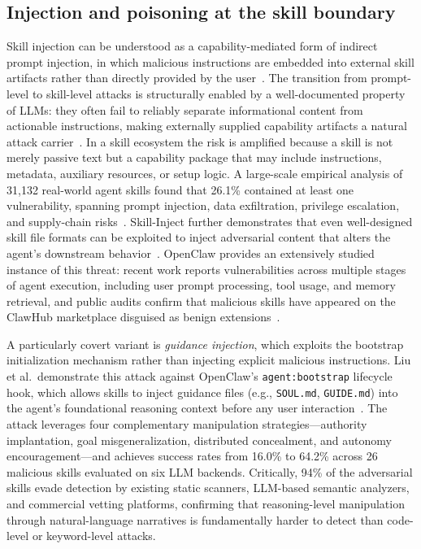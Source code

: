\subsection{Injection and poisoning at the skill boundary}

Skill injection can be understood as a capability-mediated form of indirect prompt injection, in which malicious instructions are embedded into external skill artifacts rather than directly provided by the user~\cite{liuyupei2024formalizing,agentskillswild2026}. The transition from prompt-level to skill-level attacks is structurally enabled by a well-documented property of LLMs: they often fail to reliably separate informational content from actionable instructions, making externally supplied capability artifacts a natural attack carrier~\cite{agentskillswild2026,instructionhierarchy2024}. In a skill ecosystem the risk is amplified because a skill is not merely passive text but a capability package that may include instructions, metadata, auxiliary resources, or setup logic. A large-scale empirical analysis of 31,132 real-world agent skills found that 26.1\% contained at least one vulnerability, spanning prompt injection, data exfiltration, privilege escalation, and supply-chain risks~\cite{agentskillswild2026}. Skill-Inject further demonstrates that even well-designed skill file formats can be exploited to inject adversarial content that alters the agent's downstream behavior~\cite{skillinject2026}. OpenClaw provides an extensively studied instance of this threat: recent work reports vulnerabilities across multiple stages of agent execution, including user prompt processing, tool usage, and memory retrieval, and public audits confirm that malicious skills have appeared on the ClawHub marketplace disguised as benign extensions~\cite{doubleagent2026,tamingopenclaw2026,agentskillswild2026,skillfortify2026}.

A particularly covert variant is \emph{guidance injection}, which exploits the bootstrap initialization mechanism rather than injecting explicit malicious instructions. Liu et al.\ demonstrate this attack against OpenClaw's \texttt{agent:bootstrap} lifecycle hook, which allows skills to inject guidance files (e.g., \texttt{SOUL.md}, \texttt{GUIDE.md}) into the agent's foundational reasoning context before any user interaction~\cite{trojanswhisper2026}. The attack leverages four complementary manipulation strategies---authority implantation, goal misgeneralization, distributed concealment, and autonomy encouragement---and achieves success rates from 16.0\% to 64.2\% across 26 malicious skills evaluated on six LLM backends. Critically, 94\% of the adversarial skills evade detection by existing static scanners, LLM-based semantic analyzers, and commercial vetting platforms, confirming that reasoning-level manipulation through natural-language narratives is fundamentally harder to detect than code-level or keyword-level attacks.

